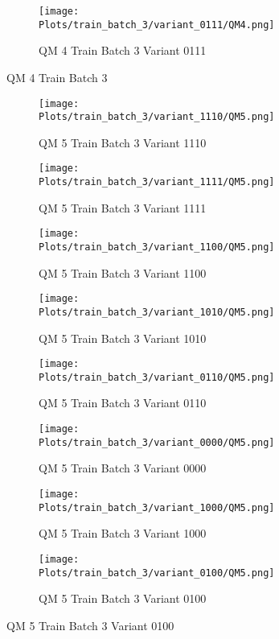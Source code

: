 \documentclass{DissertateFigs}
\begin{document}
\begin{figure}[t!]
\medskip

    \begin{subfigure}{0.47\textwidth}
    \texttt{[image: Plots/train\_batch\_3/variant\_0111/QM4.png]}
    \caption{QM 4 Train Batch 3 Variant 0111}
    \end{subfigure}
\caption{QM 4 Train Batch 3}
    \end{figure}
\clearpage
\begin{figure}[t!]
    \begin{subfigure}{0.47\textwidth}
    \texttt{[image: Plots/train\_batch\_3/variant\_1110/QM5.png]}
    \caption{QM 5 Train Batch 3 Variant 1110}
    \end{subfigure}
    \begin{subfigure}{0.47\textwidth}
    \texttt{[image: Plots/train\_batch\_3/variant\_1111/QM5.png]}
    \caption{QM 5 Train Batch 3 Variant 1111}
    \end{subfigure}

\medskip

    \begin{subfigure}{0.47\textwidth}
    \texttt{[image: Plots/train\_batch\_3/variant\_1100/QM5.png]}
    \caption{QM 5 Train Batch 3 Variant 1100}
    \end{subfigure}
    \begin{subfigure}{0.47\textwidth}
    \texttt{[image: Plots/train\_batch\_3/variant\_1010/QM5.png]}
    \caption{QM 5 Train Batch 3 Variant 1010}
    \end{subfigure}

\medskip

    \begin{subfigure}{0.47\textwidth}
    \texttt{[image: Plots/train\_batch\_3/variant\_0110/QM5.png]}
    \caption{QM 5 Train Batch 3 Variant 0110}
    \end{subfigure}
    \begin{subfigure}{0.47\textwidth}
    \texttt{[image: Plots/train\_batch\_3/variant\_0000/QM5.png]}
    \caption{QM 5 Train Batch 3 Variant 0000}
    \end{subfigure}

\medskip

    \begin{subfigure}{0.47\textwidth}
    \texttt{[image: Plots/train\_batch\_3/variant\_1000/QM5.png]}
    \caption{QM 5 Train Batch 3 Variant 1000}
    \end{subfigure}
    \begin{subfigure}{0.47\textwidth}
    \texttt{[image: Plots/train\_batch\_3/variant\_0100/QM5.png]}
    \caption{QM 5 Train Batch 3 Variant 0100}
    \end{subfigure}


\end{figure}
\end{document}
